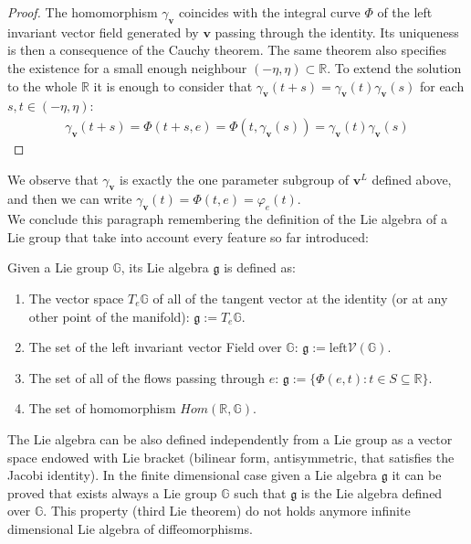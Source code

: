 \begin{proof}
	The homomorphism $\gamma_{\mathbf{v}}$ coincides with the integral curve $\Phi$ of the left invariant vector field generated by $\mathbf{v}$ passing through the identity. Its uniqueness is then a consequence of the Cauchy theorem. The same theorem also specifies the existence for a small enough neighbour $(-\eta,\eta)\subset \mathbb{R}$. To extend the solution to the whole $\mathbb{R}$ it is enough to consider that $\gamma_{\mathbf{v}}(t+s) = \gamma_{\mathbf{v}}(t) \gamma_{\mathbf{v}}(s)$ for each $s,t \in (-\eta,\eta)$:
	\begin{align*}
	\gamma_{\mathbf{v}}(t+s) = \Phi(t+s,e) =\Phi(t,\gamma_{\mathbf{v}}(s)) = \gamma_{\mathbf{v}}(t) \gamma_{\mathbf{v}}(s)
	\end{align*}
\end{proof}
We observe that $\gamma_{\mathbf{v}}$ is exactly the one parameter subgroup of $\mathbf{v}^{L}$ defined above, and then we can write $\gamma_{\mathbf{v}}(t) = \Phi(t,e) = \varphi_{e}(t)$.\\

We conclude this paragraph remembering the definition of the Lie algebra of a Lie group that take into account every feature so far introduced:
\begin{definition}
	Given a Lie group $\mathbb{G}$, its Lie algebra $\mathfrak{g}$ is defined as:
	\begin{enumerate}
		\item The vector space $T_{e}\mathbb{G}$  of all of the tangent vector at the identity (or at any other point of the manifold): $\mathfrak{g} := T_{e}\mathbb{G}$.
		\item The set of the left invariant vector Field over $\mathbb{G}$: $\mathfrak{g} := \text{left}\mathcal{V}(\mathbb{G})$.
		\item The set of all of the flows passing through $e$:  $\mathfrak{g} := \{ \Phi(e,t) : t \in S\subseteq \mathbb{R} \}$.
		\item The set of homomorphism $Hom(\mathbb{R},\mathbb{G}) $.
	\end{enumerate}
\end{definition}
The Lie algebra can be also defined independently from a Lie group as a vector space endowed with Lie bracket (bilinear form, antisymmetric, that satisfies the Jacobi identity). In the finite dimensional case given a Lie algebra $\mathfrak{g}$ it can be proved that exists always a Lie group $\mathbb{G}$ such that $\mathfrak{g}$ is the Lie algebra defined over $\mathbb{G}$. This property (third Lie theorem) do not holds anymore infinite dimensional Lie algebra of diffeomorphisms.

